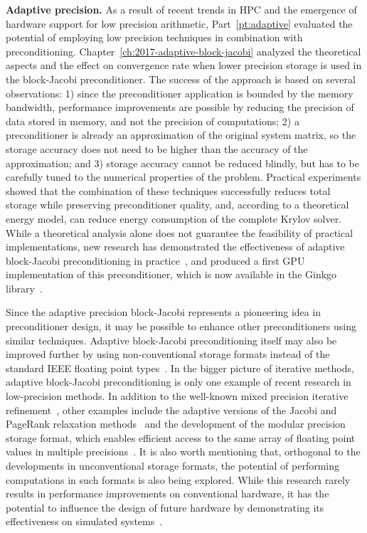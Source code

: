 \noindent\textbf{Adaptive precision.}
As a result of recent trends in HPC and the emergence of hardware support for
low precision arithmetic, Part~\ref{pt:adaptive} evaluated the potential of
employing low precision techniques in combination with preconditioning.
Chapter~\ref{ch:2017-adaptive-block-jacobi} analyzed the theoretical aspects and
the effect on convergence rate when lower precision storage is used in the
block-Jacobi preconditioner. The success of the approach is based on
several observations: 1) since the preconditioner application is bounded by the
memory bandwidth, performance improvements are possible by reducing the
precision of data stored in memory, and not the precision of computations; 2) a
preconditioner is already an approximation of the original system matrix, so the
storage accuracy does not need to be higher than the accuracy of the
approximation; and 3) storage accuracy cannot be reduced blindly, but has to be
carefully tuned to the numerical properties of the problem. Practical
experiments showed that the combination of these techniques successfully reduces
total storage while preserving preconditioner quality, and, according to a
theoretical energy model, can reduce energy consumption of the complete Krylov
solver. While a theoretical analysis alone does not guarantee the feasibility of
practical implementations, new research has demonstrated the effectiveness of
adaptive block-Jacobi preconditioning in practice~\cite{adaptive-jacobi-gpu},
and produced a first GPU implementation of this preconditioner, which is now
available in the Ginkgo library~\cite{ginkgo}.

Since the adaptive precision block-Jacobi represents a pioneering idea in
preconditioner design, it may be possible to enhance other preconditioners using
similar techniques. Adaptive block-Jacobi preconditioning itself may also be
improved further by using non-conventional storage formats instead of the
standard IEEE floating point types~\cite{adaptive-jacobi-gpu}. In the bigger
picture of iterative methods, adaptive block-Jacobi preconditioning is only one
example of recent research in low-precision methods. In addition to the
well-known mixed precision iterative refinement~\cite{higham-ir}, other examples
include the adaptive versions of the Jacobi and PageRank relaxation
methods~\cite{jacobi,jacobi-modular,pagerank} and the development of the modular
precision storage format, which enables efficient access to the same array of
floating point values in multiple
precisions~\cite{jacobi-modular,pagerank,anzt-ir}. It is also worth mentioning
that, orthogonal to the developments in unconventional storage formats, the
potential of performing computations in such formats is also being explored.
While this research rarely results in performance improvements on conventional
hardware, it has the potential to influence the design of future hardware by
demonstrating its effectiveness on simulated systems~\cite{floatx, flexfloat}.

